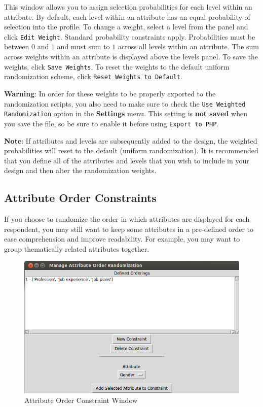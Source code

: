 \documentclass[12pt]{article}
\begin{document}
This window allows you to assign selection probabilities for each level within an attribute. By default, each level within an attribute has an equal probability of selection into the profile. To change a weight, select a level from the panel and click \texttt{Edit Weight}. Standard probability constraints apply. Probabilities must be between $0$ and $1$ and must sum to $1$ across all levels within an attribute. The sum across weights within an attribute is displayed above the levels panel. To save the weights, click \texttt{Save Weights}. To reset the weights to the default uniform randomization scheme, click \texttt{Reset Weights to Default}.

\textbf{Warning}: In order for these weights to be properly exported to the randomization scripts, you also need to make sure to check the \texttt{Use Weighted Randomization} option in the \textbf{Settings} menu. This setting is \textbf{not saved} when you save the  file, so be sure to enable it before using \texttt{Export to PHP}.

\textbf{Note}: If attributes and levels are subsequently added to the design, the weighted probabilities will reset to the default (uniform randomization). It is recommended that you define all of the attributes and levels that you wish to include in your design and then alter the randomization weights. 

\subsection{Attribute Order Constraints}

If you choose to randomize the order in which attributes are displayed for each respondent, you may still want to keep some attributes in a pre-defined order to ease comprehension and improve readability. For example, you may want to group thematically related attributes together.

\begin{figure}[ht!]
\centering\includegraphics[scale=.6]{graphics/order_screen.png}
\caption{Attribute Order Constraint Window}
\end{figure}
\end{document}
